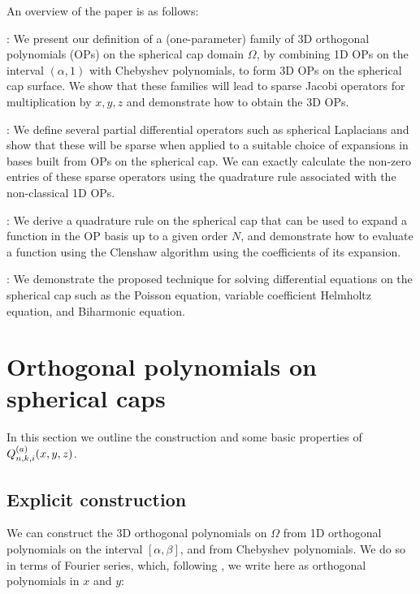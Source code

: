\documentclass[11pt, oneside]{article}   	%
\begin{document}
An overview of the paper is as follows:  

\noindent {}: We present our definition of a (one-parameter) family of 3D orthogonal polynomials (OPs) on the spherical cap domain $\Omega$, by combining 1D OPs on the interval $(\alpha, 1)$ with Chebyshev polynomials, to form 3D OPs on the spherical cap surface. We show that these families will lead to sparse Jacobi operators for multiplication by $x, y, z$ and demonstrate how to obtain the 3D OPs.

\noindent{}: We define several partial differential operators such as spherical Laplacians and  show that these will  be sparse when applied to a suitable choice of expansions in bases built from OPs on the spherical cap. We can exactly calculate the non-zero entries of these sparse operators using the quadrature rule associated with the non-classical 1D OPs.

\noindent{}: We derive a quadrature rule on the spherical cap that can be used to expand a function in the OP basis up to a given order $N$, and demonstrate how to evaluate a function using the Clenshaw algorithm using the coefficients of its expansion.

\noindent{}: We demonstrate the proposed technique for solving differential equations on the spherical cap such as the Poisson equation, variable coefficient Helmholtz equation, and Biharmonic equation.  



\section{Orthogonal polynomials on spherical caps}\label{Section:OPs}

In this section we outline the construction and some basic properties of $Q_{n,k,i}^{(a)}(x,y,z)$.

\subsection{Explicit construction}

We can construct the 3D orthogonal polynomials on $\Omega$ from 1D orthogonal polynomials on the interval \([\alpha,\beta]\), and from Chebyshev polynomials. We do so in terms of Fourier series, which, following \cite{olver2020orthogonal}, we write here as orthogonal polynomials in $x$ and $y$:
\end{document}
